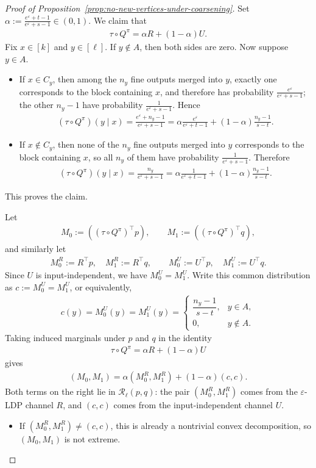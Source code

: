 \documentclass{article}
\theoremstyle{plain}
\theoremstyle{definition}
\theoremstyle{plain}
\newcommand{\eps}{\varepsilon}
\begin{document}
\begin{proof}[Proof of Proposition~\ref{prop:no-new-vertices-under-coarsening}]
Set $\displaystyle \alpha:=\frac{e^\eps+t-1}{e^\eps+s-1}\in(0,1)$.
We claim that
\begin{align*}
    \tau\circ Q^\pi=\alpha R+(1-\alpha)U.
\end{align*}
Fix $x\in[k]$ and $y\in[\ell]$. If $y\notin A$, then both sides are zero. Now suppose $y\in A$.

\begin{itemize}
    \item If $x\in C_y$, then among the $n_y$ fine outputs merged into $y$, exactly one corresponds to the block containing $x$, and therefore has probability $\frac{e^\eps}{e^\eps+s-1}$; the other $n_y-1$ have probability $\frac{1}{e^\eps+s-1}$. Hence
    \begin{align*}
        (\tau\circ Q^\pi)(y\mid x)=\frac{e^\eps+n_y-1}{e^\eps+s-1}
        =\alpha\frac{e^\eps}{e^\eps+t-1}+(1-\alpha)\frac{n_y-1}{s-t}.
    \end{align*}
    \item If $x\notin C_y$, then none of the $n_y$ fine outputs merged into $y$ corresponds to the block containing $x$, so all $n_y$ of them have probability $\frac{1}{e^\eps+s-1}$. Therefore
    \begin{align*}
        (\tau\circ Q^\pi)(y\mid x)=\frac{n_y}{e^\eps+s-1}
        =\alpha\frac{1}{e^\eps+t-1}+(1-\alpha)\frac{n_y-1}{s-t}.
    \end{align*}
\end{itemize}
This proves the claim.

Let
\begin{align*}
    M_0:=((\tau\circ Q^\pi)^\top p),
    \qquad
    M_1:=((\tau\circ Q^\pi)^\top q),
\end{align*}
and similarly let
\begin{align*}
    M_0^R:=R^\top p,\quad M_1^R:=R^\top q,
    \qquad
    M_0^U:=U^\top p,\quad M_1^U:=U^\top q.
\end{align*}
Since $U$ is input-independent, we have $M_0^U=M_1^U$. Write this common distribution as $c:=M_0^U=M_1^U$, or equivalently,
\begin{align*}
    c(y)=M_0^U(y)=M_1^U(y)=
    \begin{cases}
    \dfrac{n_y-1}{s-t}, & y\in A,\\[8pt]
    0, & y\notin A.
    \end{cases}
\end{align*}
Taking induced marginals under $p$ and $q$ in the identity
\begin{align*}
    \tau\circ Q^\pi=\alpha R+(1-\alpha)U
\end{align*}
gives
\begin{align*}
    (M_0,M_1)=\alpha(M_0^R,M_1^R)+(1-\alpha)(c,c).
\end{align*}
Both terms on the right lie in $\mathcal R_\ell(p,q)$: the pair $(M_0^R,M_1^R)$ comes from the $\eps$-LDP channel $R$, and $(c,c)$ comes from the input-independent channel $U$.
\begin{itemize}
    \item If $(M_0^R,M_1^R)\neq(c,c)$, this is already a nontrivial convex decomposition, so $(M_0,M_1)$ is not extreme.


\end{itemize}
\end{proof}
\end{document}
